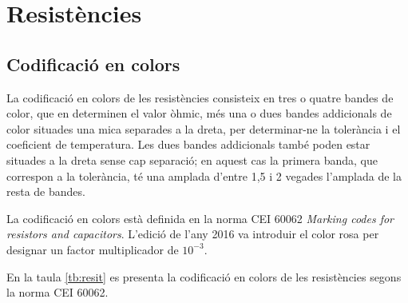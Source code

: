 \chapter{Resistències}

\section{Codificació en colors} \label{sec:resistencies-colors}

La codificació en colors  de les resistències
consisteix en tres o quatre bandes de color, que en determinen el  valor òhmic, més una o dues bandes addicionals de color situades una mica separades a la dreta, per determinar-ne la tolerància i el coeficient de temperatura. Les dues bandes addicionals també poden estar situades a la dreta sense cap separació; en aquest cas la primera banda, que correspon a la tolerància, té una amplada d'entre 1,5 i 2 vegades l'amplada de la resta de bandes.

La codificació en colors està definida en la norma CEI 60062 \textit{Marking codes for resistors and capacitors}. L'edició de l'any 2016  va introduir el color rosa per designar un factor multiplicador de $10^{-3}$.

En la taula \vref{tb:resit} es presenta la codificació en colors de les resistències segons la  norma CEI 60062.

